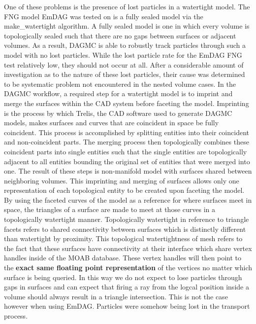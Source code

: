 \documentclass[12pt, a4paper]{article}
\begin{document}
One of these problems is the presence of lost particles in a watertight model. The FNG model EmDAG was tested on is a fully sealed model via the make\_watertight algorithm. A fully sealed model is one in which every volume is topologically sealed such that there are no gaps between surfaces or adjacent volumes. As a result, DAGMC is able to robustly track particles through such a model with no lost particles. While the lost particle rate for the EmDAG FNG test relatively low, they should not occur at all. After a considerable amount of investigation as to the nature of these lost particles, their cause was determined to be systematic problem not encountered in the nested volume cases. In the DAGMC workflow, a required step for a watertight model is to imprint and merge the surfaces within the CAD system before faceting the model. Imprinting is the process by which Trelis, the CAD software used to generate DAGMC models, makes surfaces and curves that are coincident in space be fully coincident. This process is accomplished by splitting entities into their coincident and non-coincident parts. The merging process then topologically combines these coincident parts into single entities such that the single entities are topologically adjacent to all entities bounding the original set of entities that were merged into one. The result of these steps is non-manifold model with surfaces shared between neighboring volumes. \cite{Smith_2011} This imprinting and merging of surfaces allows only one representation of each topological entity to be created upon faceting the model. By using the faceted curves of the model as a reference for where surfaces meet in space, the triangles of a surface are made to meet at those curves in a topologically watertight manner. Topologically watertight in reference to triangle facets refers to shared connectivity between surfaces which is distinctly different than watertight by proximity. This topological watertightness of mesh refers to the fact that these surfaces have connectivity at their interface which share vertex handles inside of the MOAB database. These vertex handles will then point to the \textbf{exact same floating point representation} of the vertices no matter which surface is being queried. In this way we do not expect to lose particles through gaps in surfaces and can expect that firing a ray from the logcal position inside a volume should always result in a triangle intersection. This is not the case however when using EmDAG. Particles were somehow being lost in the transport process.
\end{document}
